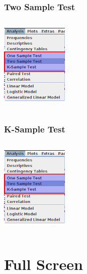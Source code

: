 \documentclass[xcolor={table},c]{beamer}
\begin{document}
\begin{frame}\frametitle{Two Sample Test}
\begin{columns}
\begin{column}{0.4\textwidth}
\includegraphics[width=3.2cm]{test1.png}
\end{column}
\begin{column}{0.6\textwidth}
\end{column}
\end{columns} 
\end{frame}


\begin{frame}\frametitle{K-Sample Test}
\begin{columns}
\begin{column}{0.4\textwidth}
\includegraphics[width=3.2cm]{test1.png}
\end{column}
\begin{column}{0.6\textwidth}
\end{column}
\end{columns}
\end{frame}


\section{Full Screen}
\end{document}
